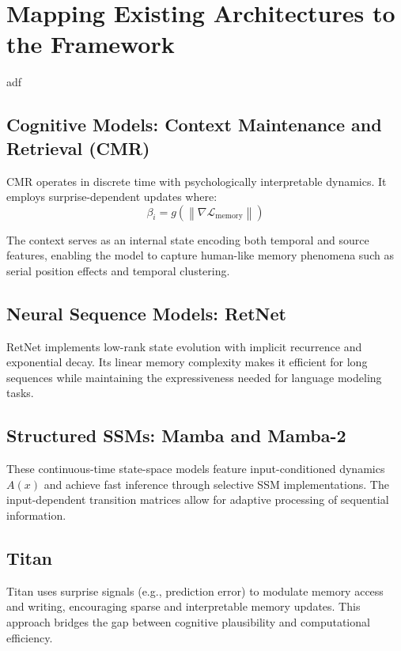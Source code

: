 \section{Mapping Existing Architectures to the Framework}
adf

\subsection{Cognitive Models: Context Maintenance and Retrieval (CMR)}
CMR operates in discrete time with psychologically interpretable dynamics. It employs surprise-dependent updates where:
\begin{equation}
\beta_i = g\left(\left\|\nabla \mathcal{L}_{\text{memory}}\right\|\right)
\end{equation}

The context serves as an internal state encoding both temporal and source features, enabling the model to capture human-like memory phenomena such as serial position effects and temporal clustering.


\subsection{Neural Sequence Models: RetNet}
RetNet implements low-rank state evolution with implicit recurrence and exponential decay. Its linear memory complexity makes it efficient for long sequences while maintaining the expressiveness needed for language modeling tasks.

\subsection{Structured SSMs: Mamba and Mamba-2}
These continuous-time state-space models feature input-conditioned dynamics $A(x)$ and achieve fast inference through selective SSM implementations. The input-dependent transition matrices allow for adaptive processing of sequential information.

\subsection{Titan}
Titan uses surprise signals (e.g., prediction error) to modulate memory access and writing, encouraging sparse and interpretable memory updates. This approach bridges the gap between cognitive plausibility and computational efficiency.


